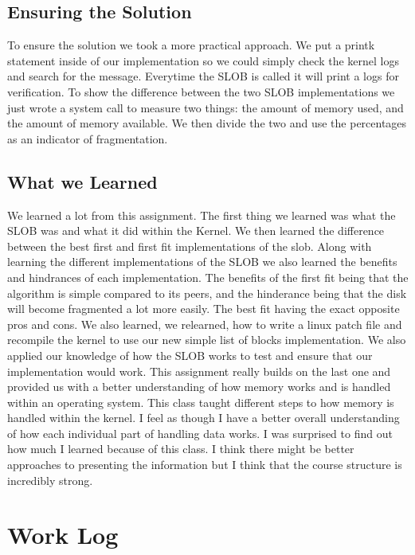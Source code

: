 \documentclass[onecolumn, draftclsnofoot,10pt, compsoc]{IEEEtran}
\begin{document}
   \subsection{Ensuring the Solution}
   
   To ensure the solution we took a more practical approach. We put a printk statement inside of our implementation so we could simply check the kernel logs and search for the message. Everytime the SLOB is called it will print a logs for verification. To show the difference between the two SLOB implementations we just wrote a system call to measure two things: the amount of memory used, and the amount of memory available. We then divide the two and use the percentages as an indicator of fragmentation.
   
   \subsection{What we Learned}
        We learned a lot from this assignment. The first thing we learned was what the SLOB was and what it did within the Kernel. We then learned the difference between the best first and first fit implementations of the slob. Along with learning the different implementations of the SLOB we also learned the benefits and hindrances of each implementation. The benefits of the first fit being that the algorithm is simple compared to its peers, and the hinderance being that the disk will become fragmented a lot more easily. The best fit having the exact opposite pros and cons. We also learned, we relearned, how to write a linux patch file and recompile the kernel to use our new simple list of blocks implementation. We also applied our knowledge of how the SLOB works to test and ensure that our implementation would work. This assignment really builds on the last one and provided us with a better understanding of how memory works and is handled within an operating system. This class taught different steps to how memory is handled within the kernel. I feel as though I have a better overall understanding of how each individual part of handling data works. I was surprised to find out how much I learned because of this class. I think there might be better approaches to presenting the information but I think that the course structure is incredibly strong.
        
        \section{Work Log}
        
\end{document}
